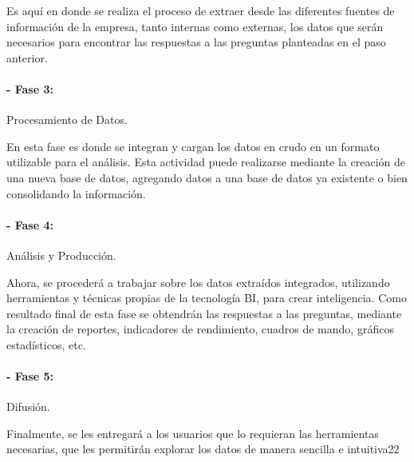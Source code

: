 \documentclass[twoside,twocolumn]{article}
\begin{document}
Es aquí en donde se realiza el proceso de extraer desde las diferentes fuentes de información de la 
empresa, tanto internas como externas, los datos que serán necesarios 
para encontrar las respuestas a las preguntas planteadas en el paso 
anterior. 
\paragraph{- Fase 3:}
Procesamiento de Datos.

En esta fase es donde se integran y 
cargan los datos en crudo en un formato utilizable para el análisis. Esta 
actividad puede realizarse mediante la creación de una nueva base de 
datos, agregando datos a una base de datos ya existente o bien 
consolidando la información. 

\paragraph{- Fase 4:}
Análisis y Producción.

Ahora, se procederá a trabajar sobre 
los datos extraídos integrados, utilizando herramientas y técnicas propias 
de la tecnología BI, para crear inteligencia. Como resultado final de esta 
fase se obtendrán las respuestas a las preguntas, mediante la creación 
de reportes, indicadores de rendimiento, cuadros de mando, gráficos 
estadísticos, etc. 
\paragraph{- Fase 5:}
Difusión.

Finalmente, se les entregará a los usuarios que lo 
requieran las herramientas necesarias, que les permitirán explorar los 
datos de manera sencilla e intuitiva22 
\end{document}
